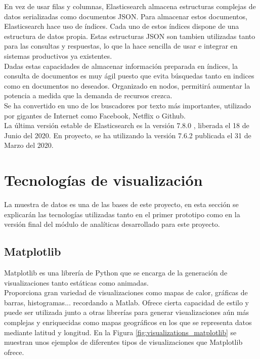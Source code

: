 \documentclass[a4paper, 12pt]{book}
\begin{document}
		En vez de usar filas y columnas, Elasticsearch almacena estructuras complejas de datos serializadas como documentos JSON. Para almacenar estos documentos, Elasticsearch hace uso de índices. Cada uno de estos índices dispone de una estructura de datos propia. Estas estructuras JSON son tambien utilizadas tanto para las consultas y respuestas, lo que la hace sencilla de usar e integrar en sistemas productivos ya existentes.\\
		
		Dadas estas capacidades de almacenar información preparada en índices, la consulta de documentos es muy ágil puesto que evita búsquedas tanto en indices como en documentos no deseados. Organizado en nodos, permitirá aumentar la potencia a medida que la demanda de recursos crezca. \\
		
		Se ha convertido en uno de los buscadores por texto más importantes, utilizado por gigantes de Internet como Facebook, Netflix o Github. \\
		
		La última versión estable de Elasticsearch es la versión 7.8.0 \cite{versions_elasticsearch}, liberada el 18 de Junio del 2020. En proyecto, se ha utilizando la versión 7.6.2 publicada el 31 de Marzo del 2020.
		
	
	\section{Tecnologías de visualización} 
	\label{sec:tecnologias_visualizacion} 
		La muestra de datos es una de las bases de este proyecto, en esta sección se explicarán las tecnologías utilizadas tanto en el primer prototipo como en la versión final del módulo de analíticas desarrollado para este proyecto.
		
	\subsection{Matplotlib}
	\label{subsec:matplotlib}
		Matplotlib es una librería de Python que se encarga de la generación de visualizaciones tanto estáticas como animadas. \\
		
		Proporciona gran variedad de visualizaciones como mapas de calor, gráficas de barras, histogramas... recordando a Matlab. Ofrece cierta capacidad de estilo y puede ser utilizada junto a otras librerías para generar visualizaciones aún más complejas y enriquecidas como mapas geográficos en los que se representa datos mediante latitud y longitud. En la Figura \ref{fig:visualizations_matplotlib} se muestran unos ejemplos de diferentes tipos de visualizaciones que Matplotlib ofrece.
		
\end{document}
